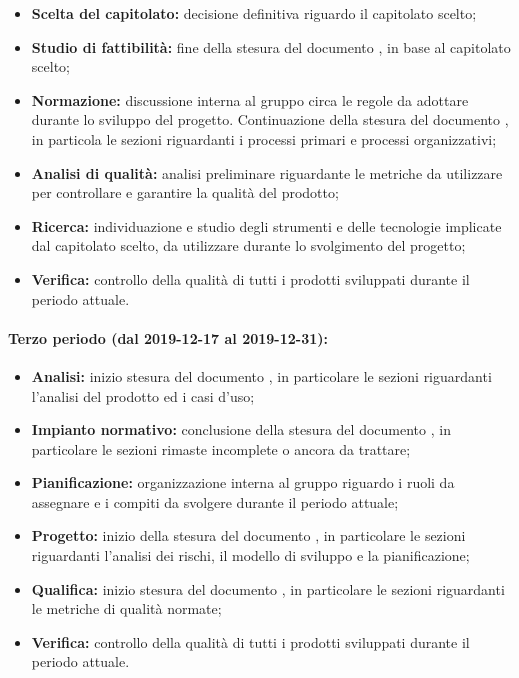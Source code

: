 				\begin{itemize}
					\item \textbf{Scelta del capitolato:} decisione definitiva riguardo il capitolato scelto;
					\item \textbf{Studio di fattibilità:} fine della stesura del documento , in base al capitolato scelto;
					\item \textbf{Normazione:} discussione interna al gruppo circa le regole da adottare durante lo sviluppo del progetto. Continuazione della stesura del documento , in particola le sezioni riguardanti i processi primari e processi organizzativi;
					\item \textbf{Analisi di qualità:} analisi preliminare riguardante le metriche da utilizzare per controllare e garantire la qualità del prodotto;
					\item \textbf{Ricerca:} individuazione e studio degli strumenti e delle tecnologie implicate dal capitolato scelto, da utilizzare durante lo svolgimento del progetto;
					\item \textbf{Verifica:} controllo della qualità di tutti i prodotti sviluppati durante il periodo attuale.
				\end{itemize}
			
			\paragraph{Terzo periodo (dal 2019-12-17 al 2019-12-31):}
			
				\begin{itemize}
					\item \textbf{Analisi:} inizio stesura del documento , in particolare le sezioni riguardanti l'analisi del prodotto ed i casi d'uso;
					\item \textbf{Impianto normativo:} conclusione della stesura del documento , in particolare le sezioni rimaste incomplete o ancora da trattare;
					\item \textbf{Pianificazione:} organizzazione interna al gruppo riguardo i ruoli da assegnare e i compiti da svolgere durante il periodo attuale;
					\item \textbf{Progetto:} inizio della stesura del documento , in particolare le sezioni riguardanti l'analisi dei rischi, il modello di sviluppo e la pianificazione;
					\item \textbf{Qualifica:} inizio stesura del documento , in particolare le sezioni riguardanti le metriche di qualità normate;
					\item \textbf{Verifica:} controllo della qualità di tutti i prodotti sviluppati durante il periodo attuale.
				\end{itemize}
			
